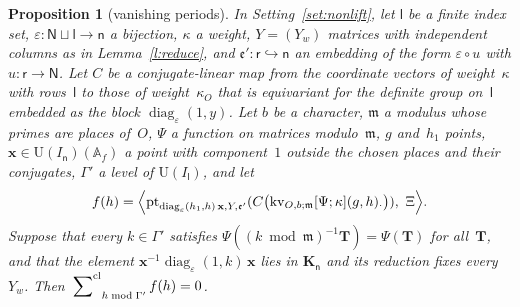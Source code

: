 \documentclass[11pt,a4paper]{article}
\newcommand{\m}[1]{\mbox{$#1$}}        %
\theoremstyle{plainx}
\newtheorem{proposition}[theorem]{Proposition}
\theoremstyle{uprightx}
\newcommand{\AAA}{\mathbb{A}}
\newcommand{\ix}[1]{\mathsf{#1}}
\newcommand{\UU}{\mathrm{U}}
\newcommand{\KK}[1]{\mathbf{K}_{#1}}
\newcommand{\clsum}[2]{\sideset{}{^{\mathrm{cl}}}\sum_{#1\bmod #2}}
\begin{document}
\begin{proposition}[vanishing periods]\label{p:period}
In Setting~\ref{set:nonlift}, let \m{\ix l} be a finite index set, \m{\varepsilon\colon\ix N\sqcup\ix l\to\ix n} a
bijection, $\kappa$ a weight, \m{Y=(Y_w)} matrices with independent columns as in Lemma~\ref{l:reduce}, and
\m{\mathfrak{e}'\colon\ix r\hookrightarrow\ix n} an embedding of the form \m{\varepsilon\circ u} with \m{u\colon\ix r\to\ix N}. Let
$C$ be a conjugate-linear map from the coordinate vectors of weight~$\kappa$ with rows~$\ix l$ to those of
weight~$\kappa_O$ that is equivariant for the definite group on~$\ix l$ embedded as the block
\m{\operatorname{diag}_\varepsilon(1,y)}. Let $b$ be a character, $\mathfrak{m}$ a modulus whose primes are places
of~$O$, $\Psi$ a function on matrices modulo~$\mathfrak{m}$, $g$ and~$h_1$ points, \m{\mathbf{x}\in\UU(I_{\ix n})(\AAA_f)} a
point with component~$1$ outside the chosen places and their conjugates, $\Gamma'$ a level of \m{\UU(I_{\ix l})}, and let
\[f(h)=\Bigl\langle\pointForm{\operatorname{diag}_\varepsilon(h_1,h)\,\mathbf{x}}{Y}{\mathfrak{e}'}{C\bigl(\kernelVector{O}{b}{\mathfrak{m}}{\Psi}{\kappa}{g}{h}{\cdot}\bigr)},\ \Xi\Bigr\rangle .\]
Suppose that every \m{k\in\Gamma'} satisfies \m{\Psi((k\bmod\mathfrak{m})^{-1}\mathbf{T})=\Psi(\mathbf{T})} for all~$\mathbf{T}$, and that the
element \m{\mathbf{x}^{-1}\operatorname{diag}_\varepsilon(1,k)\,\mathbf{x}} lies in \m{\KK{\ix n}} and its reduction fixes every~$Y_w$. Then
\m{\clsum{h}{\Gamma'}f(h)=0}.
\end{proposition}
\end{document}
